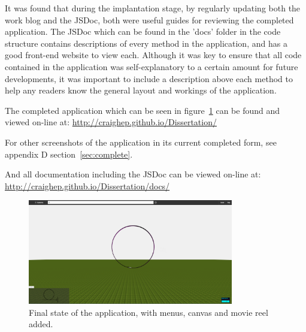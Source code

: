 It was found that during the implantation stage, by regularly updating both the work blog \cite{blog} and the JSDoc, both were useful guides for reviewing the completed application. The JSDoc which can be found in the 'docs' folder in the code structure contains descriptions of every method in the application, and has a good front-end website to view each. Although it was key to ensure that all code contained in the application was self-explanatory to a certain amount for future developments, it was important to include a description above each method to help any readers know the general layout and workings of the application. 

\clearpage

The completed application which can be seen in figure~\ref{fig:final} can be found and viewed on-line at: \url{http://craighep.github.io/Dissertation/}

For other screenshots of the application in its current completed form, see appendix D section~\ref{sec:complete}.

And all documentation including the JSDoc can be viewed on-line at: \url{http://craighep.github.io/Dissertation/docs/}

\begin{figure}[h!]
  \centering
  \includegraphics[width=0.8\textwidth]{images/final.png}
  \caption{Final state of the application, with menus, canvas and movie reel added.}
  \label{fig:final}
\end{figure}
